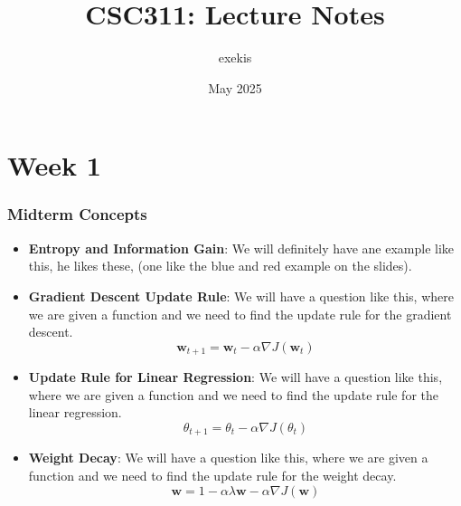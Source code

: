 \documentclass{article}
\title{CSC311: Lecture Notes}
\author{exekis}
\date{May 2025}
\begin{document}
\maketitle

\section*{Week 1}


\subsubsection*{Midterm Concepts}
\begin{itemize}
    \item \textbf{Entropy and Information Gain}: We will definitely have ane example like this, he likes these, (one like the blue and red example on the slides).
    \item \textbf{Gradient Descent Update Rule}: We will have a question like this, where we are given a function and we need to find the update rule for the gradient descent.
    \begin{equation}
        \mathbf{w}_{t+1} = \mathbf{w}_t - \alpha \nabla J(\mathbf{w}_t)
    \end{equation}
    \item \textbf{Update Rule for Linear Regression}: We will have a question like this, where we are given a function and we need to find the update rule for the linear regression.
    \begin{equation}
        \theta_{t+1} = \theta_t - \alpha \nabla J(\theta_t)
    \end{equation}
    \item \textbf{Weight Decay}: We will have a question like this, where we are given a function and we need to find the update rule for the weight decay.
    \begin{equation}
        \mathbf{w} = 1 - \alpha \lambda \mathbf{w} - \alpha \nabla J(\mathbf{w})
    \end{equation}
\end{itemize}
\end{document}
